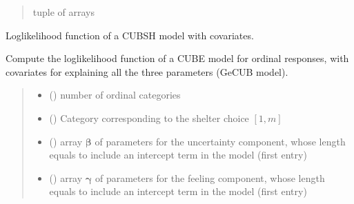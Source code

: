 \documentclass[letterpaper,10pt,english]{sphinxmanual}
\begin{document}
\begin{fulllineitems}
\begin{quote}
\begin{description}
\sphinxAtStartPar
tuple of arrays

\end{description}\end{quote}

\end{fulllineitems}


\begin{fulllineitems}
\label{\detokenize{cubmods:cubmods.cubsh_ywx.loglik}}
\pysigstartsignatures
{}
\pysigstopsignatures
\sphinxAtStartPar
Log\sphinxhyphen{}likelihood function of a CUBSH model with covariates.

\sphinxAtStartPar
Compute the log\sphinxhyphen{}likelihood function of a CUBE model for ordinal responses,
with covariates for explaining all the three parameters (GeCUB model).
\begin{quote}\begin{description}
\begin{itemize}
\item {} 
\sphinxAtStartPar
{} () \textendash{} number of ordinal categories

\item {} 
\sphinxAtStartPar
{} () \textendash{} Category corresponding to the shelter choice \([1,m]\)

\item {} 
\sphinxAtStartPar
{} () \textendash{} array \(\pmb \beta\) of parameters for the uncertainty component, whose length equals 
 to include an intercept term in the model (first entry)

\item {} 
\sphinxAtStartPar
{} () \textendash{} array \(\pmb \gamma\) of parameters for the feeling component, whose length equals 
 to include an intercept term in the model (first entry)


\end{itemize}
\end{description}
\end{quote}
\end{fulllineitems}
\end{document}
